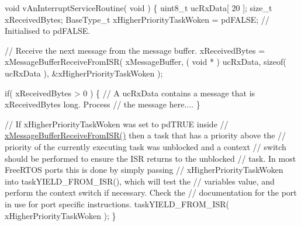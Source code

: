 \begin{DoxyPre}void vAnInterruptServiceRoutine( void )
\{
uint8\_t ucRxData[ 20 ];
size\_t xReceivedBytes;
BaseType\_t xHigherPriorityTaskWoken = pdFALSE;  // Initialised to pdFALSE.\end{DoxyPre}



\begin{DoxyPre}    // Receive the next message from the message buffer.
    xReceivedBytes = xMessageBufferReceiveFromISR( xMessageBuffer,
                                                  ( void * ) ucRxData,
                                                  sizeof( ucRxData ),
                                                  \&xHigherPriorityTaskWoken );\end{DoxyPre}



\begin{DoxyPre}    if( xReceivedBytes > 0 )
    \{
        // A ucRxData contains a message that is xReceivedBytes long.  Process
        // the message here....
    \}\end{DoxyPre}



\begin{DoxyPre}    // If xHigherPriorityTaskWoken was set to pdTRUE inside
    // \mbox{\hyperlink{message__buffer_8h_adf596c00c44752a3c8c542cc6b5df234}{xMessageBufferReceiveFromISR()}} then a task that has a priority above the
    // priority of the currently executing task was unblocked and a context
    // switch should be performed to ensure the ISR returns to the unblocked
    // task.  In most FreeRTOS ports this is done by simply passing
    // xHigherPriorityTaskWoken into taskYIELD\_FROM\_ISR(), which will test the
    // variables value, and perform the context switch if necessary.  Check the
    // documentation for the port in use for port specific instructions.
    taskYIELD\_FROM\_ISR( xHigherPriorityTaskWoken );
\}
\end{DoxyPre}
 